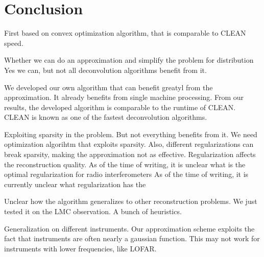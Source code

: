 \section{Conclusion}

First based on convex optimization algorithm, that is comparable to CLEAN speed.

Whether we can do an approximation and simplify the problem for distribution
Yes we can, but not all deconvolution algorithms benefit from it.

We developed our own algorithm that can benefit greatyl from the approximation. It already benefits from single machine processing. From our results, the developed algorithm is comparable to the runtime of CLEAN. CLEAN is known as one of the fastest deconvolution algorithms.

Exploiting sparsity in the problem. But not everything benefits from it. We need optimization algorihtm that exploits sparsity. Also, different regularizations can break sparsity, making the approximation not as effective.
Regularization affects the reconstruction quality. As of the time of writing, it is unclear what is the optimal regularization for radio interferometers
As of the time of writing, it is currently unclear what regularization has the

Unclear how the algorithm generalizes to other reconstruction problems. We just tested it on the LMC observation. A bunch of heuristics.

Generalization on different instruments. Our approximation scheme exploits the fact that instruments are often nearly a gaussian function. This may not work for instruments with lower frequencies, like LOFAR. 
 
